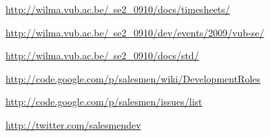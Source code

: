 \documentclass{article}
\begin{document}
\begin{thebibliography}{99}

	\href{http://wilma.vub.ac.be/~se2_0910/docs/timesheets/}{http://wilma.vub.ac.be/~se2_0910/docs/timesheets/}
		
	\href{http://wilma.vub.ac.be/~se2_0910/dev/events/2009/vub-se/}{http://wilma.vub.ac.be/~se2_0910/dev/events/2009/vub-se/}
	
	\href{http://wilma.vub.ac.be/~se2_0910/docs/std/}{http://wilma.vub.ac.be/~se2_0910/docs/std/}

	\href{http://code.google.com/p/salesmen/wiki/DevelopmentRoles}{http://code.google.com/p/salesmen/wiki/DevelopmentRoles}
	
	\href{http://code.google.com/p/salesmen/issues/list}{http://code.google.com/p/salesmen/issues/list}
	
	\href{http://twitter.com/salesmendev}{http://twitter.com/salesmendev}
	
	
\end{thebibliography}
\end{document}
